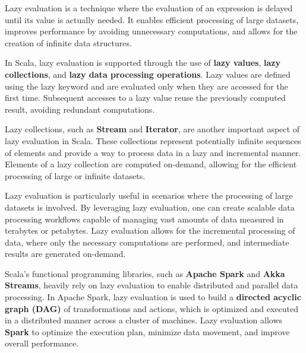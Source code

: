 Lazy evaluation is a technique where the evaluation of an expression is delayed until its value is actually needed. It enables efficient processing of large datasets, improves performance by avoiding unnecessary computations, and allows for the creation of infinite data structures.\footnotemark {}

In Scala, lazy evaluation is supported through the use of \textbf{lazy values}, \textbf{lazy collections}, and \textbf{lazy data processing operations}. Lazy values are defined using the lazy keyword and are evaluated only when they are accessed for the first time. Subsequent accesses to a lazy value reuse the previously computed result, avoiding redundant computations.\footnotemark[11]



Lazy collections, such as \textbf{Stream} and \textbf{Iterator}, are another important aspect of lazy evaluation in Scala. These collections represent potentially infinite sequences of elements and provide a way to process data in a lazy and incremental manner. Elements of a lazy collection are computed on-demand, allowing for the efficient processing of large or infinite datasets.\footnotemark {}



Lazy evaluation is particularly useful in scenarios where the processing of large datasets is involved. By leveraging lazy evaluation, one can create scalable data processing workflows capable of managing vast amounts of data measured in terabytes or petabytes. Lazy evaluation allows for the incremental processing of data, where only the necessary computations are performed, and intermediate results are generated on-demand.\footnotemark {}

Scala's functional programming libraries, such as \textbf{Apache Spark} and \textbf{Akka Streams}, heavily rely on lazy evaluation to enable distributed and parallel data processing. In Apache Spark, lazy evaluation is used to build a \textbf{directed acyclic graph (DAG)} of transformations and actions, which is optimized and executed in a distributed manner across a cluster of machines. Lazy evaluation allows \textbf{Spark} to optimize the execution plan, minimize data movement, and improve overall performance.\footnotemark[13]




